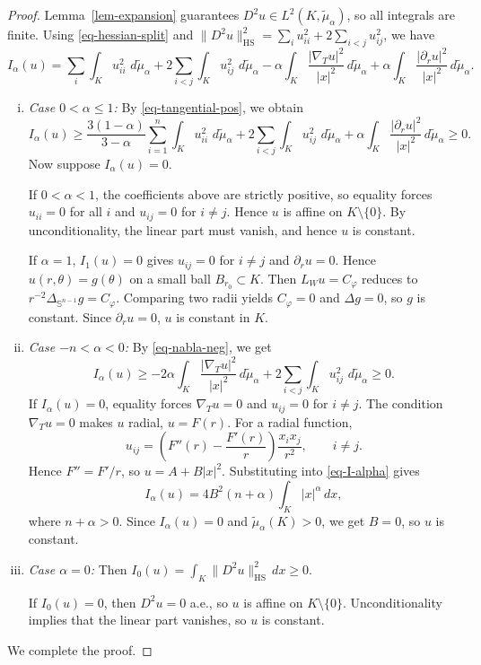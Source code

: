 \documentclass[12pt,leqno]{amsart}
\theoremstyle{plain} \newtheorem{thm}{Theorem}[section]
\theoremstyle{plain} \newtheorem{prop}[thm]{Proposition}
\theoremstyle{plain} \newtheorem{prob}[thm]{Problem}
\theoremstyle{definition} \newtheorem{defi}[thm]{Definition}
\theoremstyle{plain} \newtheorem{cor}[thm]{Corollary}
\theoremstyle{plain} \newtheorem{lem}[thm]{Lemma}
\theoremstyle{plain} \newtheorem{eg}{Example}[section]
\theoremstyle{remark} \newtheorem{rmk}[thm]{Remark}
\theoremstyle{plain} \newtheorem{conj}{Conjecture}
\numberwithin{equation}{section}
\newcommand{\dd}{\,d}
\newcommand{\HS}{\mathrm{HS}}
\begin{document}
\begin{proof}
  Lemma~\ref{lem-expansion} guarantees
  $D^2u\in L^2(K,\tilde{\mu}_\alpha)$, so all integrals are finite.
  Using \eqref{eq-hessian-split} and
  $\|D^2u\|_{\HS}^2=\sum_i u_{ii}^2+2\sum_{i<j}u_{ij}^2$, we have
  \[
    I_\alpha(u)
    =
    \sum_i\int_K u_{ii}^2\,\dd\tilde{\mu}_\alpha
    +2\sum_{i<j}\int_K u_{ij}^2\,\dd\tilde{\mu}_\alpha
    -\alpha\int_K\frac{|\nabla_Tu|^2}{|x|^2}\dd\tilde{\mu}_\alpha
    +\alpha\int_K\frac{|\partial_ru|^2}{|x|^2}\dd\tilde{\mu}_\alpha .
  \]

  \begin{enumerate}[(i)]
  \item \emph{Case $0<\alpha\le1$:}
  By \eqref{eq-tangential-pos}, we obtain
  \[
    I_\alpha(u)
    \ge
    \frac{3(1-\alpha)}{3-\alpha}
    \sum_{i=1}^n\int_K u_{ii}^2\,\dd\tilde{\mu}_\alpha
    + 2\sum_{i<j}\int_K u_{ij}^2\,\dd\tilde{\mu}_\alpha
    + \alpha\int_K\frac{|\partial_ru|^2}{|x|^2}\dd\tilde{\mu}_\alpha
    \ge0.
  \]
   Now suppose $I_\alpha(u)=0$.

  If $0<\alpha<1$, the coefficients above are strictly positive, so
  equality forces $u_{ii}=0$ for all $i$ and $u_{ij}=0$ for $i\neq j$.
  Hence $u$ is affine on $K\setminus\{0\}$. By unconditionality, the linear part must vanish, and hence $u$ is constant.

  If $\alpha=1$, $I_1(u)=0$ gives $u_{ij}=0$ for $i\neq j$ and $\partial_ru=0$.
  Hence $u(r,\theta)=g(\theta)$ on a small ball $B_{r_0}\subset K$.
  Then $L_Wu=C_\varphi$ reduces to $r^{-2}\Delta_{\mathbb{S}^{n-1}}g=C_\varphi$.
  Comparing two radii yields $C_\varphi=0$ and $\Delta g=0$, so $g$ is constant.
  Since $\partial_ru=0$, $u$ is constant in $K$.

  \item \emph{Case $-n<\alpha<0$:}
  By \eqref{eq-nabla-neg}, we get
  \[
    I_\alpha(u)
    \ge
    -2\alpha\int_K\frac{|\nabla_Tu|^2}{|x|^2}\dd\tilde{\mu}_\alpha
    +2\sum_{i<j}\int_Ku_{ij}^2\,\dd\tilde{\mu}_\alpha
    \ge0.
  \]
    If $I_\alpha(u)=0$, equality forces $\nabla_Tu=0$ and $u_{ij}=0$ for
  $i\neq j$. The condition $\nabla_Tu=0$ makes $u$ radial,
  $u=F(r)$. For a radial function,
  \[
    u_{ij}=\left(F''(r)-\frac{F'(r)}r\right)\frac{x_ix_j}{r^2},\qquad i\ne j.
  \]
  Hence $F''=F'/r$, so $u=A+B|x|^2$.
  Substituting into \eqref{eq-I-alpha} gives
  \[
    I_\alpha(u)=4B^2(n+\alpha)\int_K|x|^\alpha\dd x,
  \]
  where $n+\alpha>0$.  Since $I_\alpha(u)=0$ and
  $\tilde{\mu}_\alpha(K)>0$, we get $B=0$, so $u$ is constant.
  
  \item \emph{Case $\alpha=0$:}
  Then $I_0(u)=\int_K\|D^2u\|_{\HS}^2\dd x\ge0$.

  If $I_0(u)=0$, then $D^2u=0$ a.e., so $u$ is affine on
  $K\setminus\{0\}$. Unconditionality implies that the linear part vanishes, so $u$ is constant.
  \end{enumerate}

  We complete the proof.
\end{proof}
\end{document}
